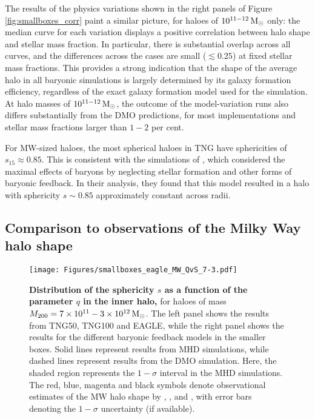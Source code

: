 \documentclass[fleqn,usenatbib]{mnras}
\def\msun{\,\rm M_{\odot}}
\begin{document}
The results of the physics variations shown in the right panels of Figure \ref{fig:smallboxes_corr} paint a similar picture, for haloes of $10^{11-12} \msun$ only:
the median curve for each variation displays a positive correlation between halo shape and stellar mass fraction.
In particular, there is substantial overlap across all curves, and the differences across the cases are small ($\lesssim 0.25$) at fixed stellar mass fractions.
This provides a strong indication that the shape of the average halo in all baryonic simulations is largely determined by its  galaxy formation efficiency, regardless of the exact galaxy formation model used for the simulation. At halo masses of $10^{11-12} \msun$, the outcome of the model-variation runs also differs substantially from the DMO predictions, for most implementations and stellar mass fractions larger than $1-2$ per cent.

For MW-sized haloes, the most spherical haloes in TNG have sphericities of $s_{15} \approx 0.85$.
This is consistent with the simulations of \cite{Abadi10v407}, which considered the maximal effects of baryons by neglecting stellar formation and other forms of baryonic feedback.
In their analysis, they found that this model resulted in a halo with sphericity $s \sim 0.85$ approximately constant across radii.





\subsection{Comparison to observations of the Milky Way halo shape}


\begin{figure*}
    \centering
    \texttt{[image: Figures/smallboxes\_eagle\_MW\_QvS\_7-3.pdf]}
    \caption{{\bf Distribution of the sphericity $s$ as a function of the parameter $q$ in the inner halo,} for haloes of mass $M_{200}=7\times10^{11}-3\times10^{12} \msun$.
    The left panel shows the results from TNG50, TNG100 and EAGLE, while the right panel shows the results for the different baryonic feedback models in the smaller boxes.
    Solid lines represent results from MHD simulations, while dashed lines represent results from the DMO simulation.
    Here, the shaded region represents the $1-\sigma$ interval in the MHD simulations.
    The red, blue, magenta and black symbols denote observational estimates of the MW halo shape by \protect\cite{Malhan19v487}, \protect\cite{Bovy16v833}, \protect\cite{Vera-Ciro13v773} and \protect\cite{Law10v714}, with error bars denoting the $1-\sigma$ uncertainty (if available).
    }
    \label{fig:smallboxes_QS}
\end{figure*}
\end{document}
